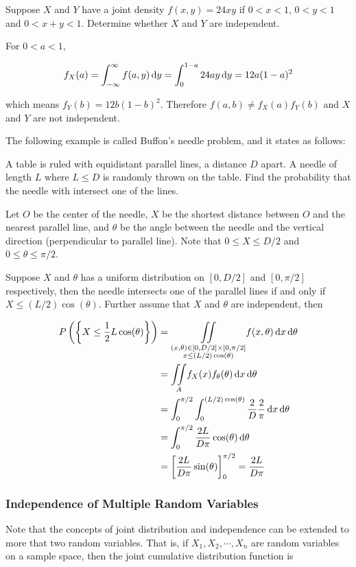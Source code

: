 \documentclass[a4paper,12pt]{article}
\begin{document}
\begin{exm}
  Suppose $X$ and $Y$ have a joint density $f(x,y)=24xy$ if $0<x<1$, $0<y<1$ and $0<x+y<1$. Determine whether $X$ and $Y$ are independent.\n

  \ans For $0<a<1$,

  $$f_{X}(a)=\int_{-\infty}^{\infty}f(a,y)\,\mathrm{d} y=\int_{0}^{1-a}24ay\,\mathrm{d} y=12a(1-a)^{2}$$\s

  which means $f_{Y}(b)=12b(1-b)^{2}$. Therefore $f(a,b)\neq f_{X}(a)f_{Y}(b)$ and $X$ and $Y$ are not independent.
\end{exm}\n

The following example is called Buffon's needle problem, and it states as follows:\n

\begin{exm}
  A table is ruled with equidistant parallel lines, a distance $D$ apart. A needle of length $L$ where $L\leq D$ is randomly thrown on the table. Find the probability that the needle with intersect one of the lines.\n

  \ans Let $O$ be the center of the needle, $X$ be the shortest distance between $O$ and the nearest parallel line, and $\theta$ be the angle between the needle and the vertical direction (perpendicular to parallel line). Note that $0\leq X\leq D/2$ and $0\leq\theta\leq\pi/2$.\n

  Suppose $X$ and $\theta$ has a uniform distribution on $[0,D/2]$ and $[0,\pi/2]$ respectively, then the needle intersects one of the parallel lines if and only if $X\leq(L/2)\cos(\theta)$. Further assume that $X$ and $\theta$ are independent, then

  $$\begin{aligned}[t]
    P\left( \left\{ X\leq\frac{1}{2}L\cos(\theta)\right\}\right)&=\underset{\substack{(x,\theta)\in[0,D/2]\times[0,\pi/2]\\x\leq(L/2)\cos(\theta)}}{\iint}f(x,\theta)\,\mathrm{d} x\,\mathrm{d}\theta\\
    &=\underset{A}{\iint}f_{X}(x)f_{\theta}(\theta)\,\mathrm{d} x\,\mathrm{d}\theta\\
    &=\int_{0}^{\pi/2}\int_{0}^{(L/2)\cos(\theta)}\frac{2}{D}\frac{2}{\pi}\,\mathrm{d} x\,\mathrm{d}\theta\\
    &=\int_{0}^{\pi/2}\frac{2L}{D\pi}\cos(\theta)\,\mathrm{d}\theta\\
    &=\left[ \frac{2L}{D\pi}\sin(\theta)\right]_{0}^{\pi/2}=\frac{2L}{D\pi}
  \end{aligned}$$
\end{exm}

\subsubsection{Independence of Multiple Random Variables}
Note that the concepts of joint distribution and independence can be extended to more that two random variables. That is, if $X_{1},X_{2},\cdots,X_{n}$ are random variables on a sample space, then the joint cumulative distribution function is
\end{document}
